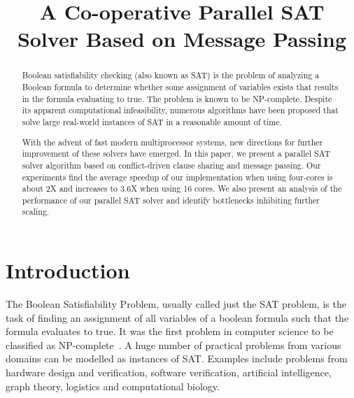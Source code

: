 \documentclass[letterpaper, compsoc, conference]{IEEEtran}
\begin{document}
\title{A Co-operative Parallel SAT Solver Based on Message Passing}

\author{
    \and {}
}
\maketitle
\pagestyle{plain}
\setcounter{page}{1}

\begin{abstract}
Boolean satisfiability checking (also known as SAT) is the problem of analyzing
a Boolean formula to determine whether some assignment of variables exists that
results in the formula evaluating to true. The problem is known to be
NP-complete. Despite its apparent computational infeasibility, numerous
algorithms have been proposed that solve large real-world instances of SAT in a
reasonable amount of time. 

With the advent of fast modern multiprocessor systems, new directions for
further improvement of these solvers have emerged. In this paper, we present a
parallel SAT solver algorithm based on conflict-driven clause sharing and
message passing. Our experiments find the average speedup of our implementation
when using four-cores is about 2X and increases to 3.6X when using 16 cores.
We also present an analysis of the performance of our parallel SAT solver and
identify bottlenecks inhibiting further scaling.

\end{abstract}

\section{Introduction}
The Boolean Satisfiability Problem, usually called just the SAT problem, is the
task of finding an assignment of all variables of a boolean formula such that
the formula evaluates to true. It was the first problem in computer science to
be classified as NP-complete~\cite{Cook1971}. A huge number of practical
problems from various domains can be modelled as instances of SAT.  Examples
include problems from hardware design and verification, software verification,
artificial intelligence, graph theory, logistics and computational biology. 
\end{document}
